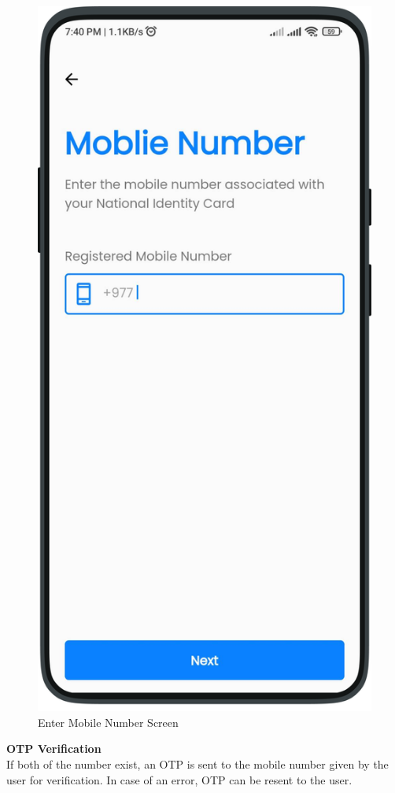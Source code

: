 \begin{multicols}{2}
      \begin{figure}[H]
            \centering
            \includegraphics[width=0.6\linewidth]{images/results/mobile/MobileNumber.png}
            \caption[Enter Mobile Number Screen]{Enter Mobile Number Screen}
            \label{fig:MobileNumber.png}
            \end{figure}
\end{multicols}
\textbf{OTP Verification}\\
    If both of the number exist, an OTP is sent to the mobile number given by the user for verification. In case of an error, OTP can be resent to the user. 
    \newpage
